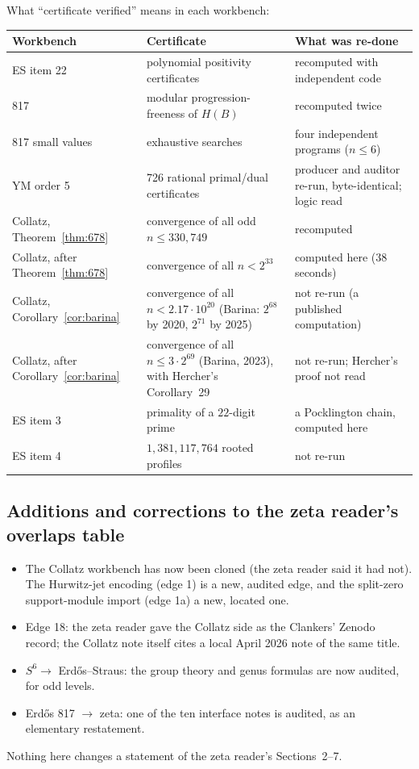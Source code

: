 What ``certificate verified'' means in each workbench:
\begin{center}\small
\begin{tabularx}{\linewidth}{@{}l >{\raggedright\arraybackslash}X >{\raggedright\arraybackslash}X@{}}
\toprule
Workbench & Certificate & What was re-done\\
\midrule
ES item 22 & polynomial positivity certificates & recomputed with independent code\\
817 & modular progression-freeness of $H(B)$ & recomputed twice\\
817 small values & exhaustive searches & four independent programs ($n\le6$)\\
YM order 5 & 5{,}726 rational primal/dual certificates & producer and auditor re-run, byte-identical; logic read\\
Collatz, Theorem~\ref{thm:678} & convergence of all odd $n\le330{,}749$ & recomputed\\
Collatz, after Theorem~\ref{thm:678} & convergence of all $n<2^{33}$ & computed here (38 seconds)\\
Collatz, Corollary~\ref{cor:barina} & convergence of all $n<2.17\cdot10^{20}$ (Barina: $2^{68}$ by 2020, $2^{71}$ by 2025) & not re-run (a published computation)\\
Collatz, after Corollary~\ref{cor:barina} & convergence of all $n\le3\cdot2^{69}$ (Barina, 2023), with Hercher's Corollary~29 & not re-run; Hercher's proof not read\\
ES item 3 & primality of a $22$-digit prime & a Pocklington chain, computed here\\
ES item 4 & $1{,}381{,}117{,}764$ rooted profiles & not re-run\\
\bottomrule
\end{tabularx}
\end{center}

\subsection{Additions and corrections to the zeta reader's overlaps table}\label{ssec:corrections}

\begin{itemize}
\item The Collatz workbench has now been cloned (the zeta reader said it had not). The Hurwitz-jet encoding (edge 1) is a new, audited edge, and the split-zero support-module import (edge 1a) a new, located one.
\item Edge 18: the zeta reader gave the Collatz side as the Clankers' Zenodo record; the Collatz note itself cites a local April 2026 note of the same title.
\item $S^6\to$ Erdős--Straus: the group theory and genus formulas are now audited, for odd levels.
\item Erdős 817 $\to$ zeta: one of the ten interface notes is audited, as an elementary restatement.
\end{itemize}
Nothing here changes a statement of the zeta reader's Sections~2--7.
